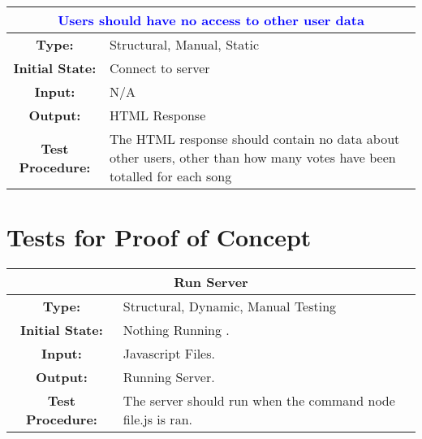 \documentclass[12pt, titlepage]{article}
\begin{document}
\begin{center}
\begin{table}[H]
\begin{tabularx}{\textwidth}{| c X |}
\hline
\multicolumn{2}{|c|}{\textbf{\textcolor{blue}{Users should have no access to other user data}}}\\
\hline
\textbf{Type: } & Structural, Manual, Static\\
\textbf{Initial State: } & Connect to server\\
\textbf{Input: } & N/A\\
\textbf{Output: } & HTML Response \\
\textbf{Test Procedure:  } & The HTML response should contain no data about other users, other than how many votes have been totalled for each song \\
\hline
\end{tabularx}
\end{table}
\end{center}

\section{Tests for Proof of Concept}



\begin{center}
\begin{table}[H]
\begin{tabularx}{\textwidth}{| c X |}
\hline
\multicolumn{2}{|c|}{\textbf{Run Server}}\\
\hline
\textbf{Type: } & Structural, Dynamic, Manual Testing\\

\textbf{Initial State: } & Nothing Running .\\

\textbf{Input: } & Javascript Files.\\

\textbf{Output: } & Running Server.\\

\textbf{Test Procedure: } & The server should run when the command node file.js is ran. \\
\hline
\end{tabularx}
\end{table}
\end{center}
\end{document}
